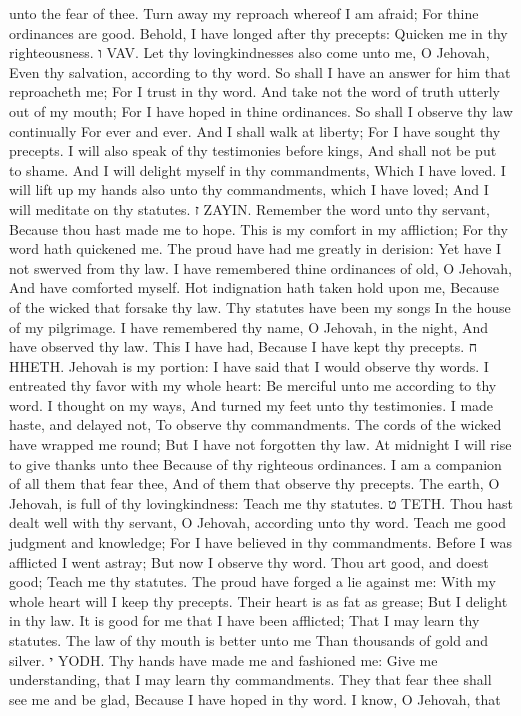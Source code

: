 unto the fear of thee.  Turn away my reproach whereof I am afraid; For thine ordinances are good.  Behold, I have longed after thy precepts: Quicken me in thy righteousness. ו VAV.  Let thy lovingkindnesses also come unto me, O Jehovah, Even thy salvation, according to thy word.  So shall I have an answer for him that reproacheth me; For I trust in thy word.  And take not the word of truth utterly out of my mouth; For I have hoped in thine ordinances.  So shall I observe thy law continually For ever and ever.  And I shall walk at liberty; For I have sought thy precepts.  I will also speak of thy testimonies before kings, And shall not be put to shame.  And I will delight myself in thy commandments, Which I have loved.  I will lift up my hands also unto thy commandments, which I have loved; And I will meditate on thy statutes. ז ZAYIN.  Remember the word unto thy servant, Because thou hast made me to hope.  This is my comfort in my affliction; For thy word hath quickened me.  The proud have had me greatly in derision: Yet have I not swerved from thy law.  I have remembered thine ordinances of old, O Jehovah, And have comforted myself.  Hot indignation hath taken hold upon me, Because of the wicked that forsake thy law.  Thy statutes have been my songs In the house of my pilgrimage.  I have remembered thy name, O Jehovah, in the night, And have observed thy law.  This I have had, Because I have kept thy precepts. ח HHETH.  Jehovah is my portion: I have said that I would observe thy words.  I entreated thy favor with my whole heart: Be merciful unto me according to thy word.  I thought on my ways, And turned my feet unto thy testimonies.  I made haste, and delayed not, To observe thy commandments.  The cords of the wicked have wrapped me round; But I have not forgotten thy law.  At midnight I will rise to give thanks unto thee Because of thy righteous ordinances.  I am a companion of all them that fear thee, And of them that observe thy precepts.  The earth, O Jehovah, is full of thy lovingkindness: Teach me thy statutes. ט TETH.  Thou hast dealt well with thy servant, O Jehovah, according unto thy word.  Teach me good judgment and knowledge; For I have believed in thy commandments.  Before I was afflicted I went astray; But now I observe thy word.  Thou art good, and doest good; Teach me thy statutes.  The proud have forged a lie against me: With my whole heart will I keep thy precepts.  Their heart is as fat as grease; But I delight in thy law.  It is good for me that I have been afflicted; That I may learn thy statutes.  The law of thy mouth is better unto me Than thousands of gold and silver. י YODH.  Thy hands have made me and fashioned me: Give me understanding, that I may learn thy commandments.  They that fear thee shall see me and be glad, Because I have hoped in thy word.  I know, O Jehovah, that 